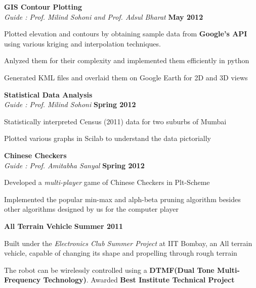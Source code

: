 \documentclass[margin,11pt]{resume}
\begin{document}
\begin{resume}
\textbf{GIS Contour Plotting}\vspace{1mm} \hfill\\ 
\textsl{Guide : Prof. Milind Sohoni and Prof. Adsul Bharat}	\hfill \textbf{May 2012}\vspace{-4mm}\\
				\begin{list2}
				\item Plotted elevation and contours by obtaining sample data from \textbf{Google's API} using various kriging and interpolation techniques. 
				\item Anlyzed them for their complexity and implemented them efficiently in python
				\item Generated KML files and overlaid them on Google Earth for 2D and 3D views
				\end{list2}				\vspace{-2.75mm} 


\textbf{Statistical Data Analysis}\vspace{1mm} \hfill\\ 
\textsl{Guide : Prof. Milind Sohoni}	\hfill \textbf{Spring 2012} \vspace{-5mm}\\
				\begin{list2}
				\item Statistically interpreted Census (2011) data for two suburbs of Mumbai
				\item Plotted various graphs in Scilab to understand the data pictorially
				\end{list2}
				\vspace{-2.75mm} 

    \textbf{Chinese Checkers}\vspace{1mm} \hfill\\
		\textsl{Guide : Prof. Amitabha Sanyal} \hfill \textbf{Spring 2012} \vspace{-5mm}\\
				\begin{list2}
				\item
				Developed a \emph{multi-player} game of Chinese Checkers in Plt-Scheme
				\item Implemented the popular min-max and alph-beta pruning algorithm besides other algorithms designed by us for the computer player
				\end{list2} \vspace{-2.75mm} 
\textbf{All Terrain Vehicle}\vspace{1mm} \hfill
\textbf{Summer 2011} \vspace{-5mm} \\
		 \begin{list2}
    \item
		 Built under the \emph{Electronics Club Summer Project} at IIT Bombay, an All terrain vehicle, capable of changing its shape  and propelling through rough terrain
		 \item The robot can be wirelessly controlled using a \textbf{DTMF(Dual Tone Multi-Frequency Technology)}. Awarded \textbf{Best Institute Technical Project}
\end{list2} \vspace{-1.75mm}  


\end{resume}
\end{document}
